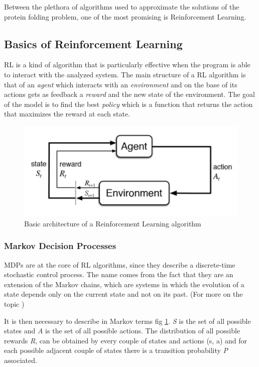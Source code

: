 Between the plethora of algorithms used to approximate the solutions of the protein folding problem, one of the most promising is Reinforcement Learning.

\subsection{Basics of Reinforcement Learning} \label{BRL}

RL is a kind of algorithm that is particularly effective when the program is able to interact with the analyzed system.
The main structure of a RL algorithm is that of an \emph{agent} which interacts with an \emph{environment} and on the base of its actions gets as feedback a \emph{reward} and the new state of the environment.
The goal of the model is to find the best \emph{policy} which is a function that returns the action that maximizes the reward at each state.


\begin{figure}[H]
    \centering
    \includegraphics[width=.75\textwidth]{img/rl0.png}
    \caption{Basic architecture of a Reinforcement Learning algorithm}
    \label{fig:rl0}
\end{figure}

\subsubsection{Markov Decision Processes}

MDPs are at the core of RL algorithms, since they describe a discrete-time stochastic control process.
The name comes from the fact that they are an extension of the Markov chains, which are systems in which the evolution of a state depends only on the current state and not on its past. (For more on the topic \cite{bellman1957markovian})


It is then necessary to describe in Markov terms fig \ref{fig:rl0}.
\emph{S} is the set of all possible states and \emph{A} is the set of all possible actions.
The distribution of all possible rewards \emph{R}, can be obtained by every couple of states and actions (s, a) and for each possible adjacent couple of states there is a transition probability \emph{P} associated.

